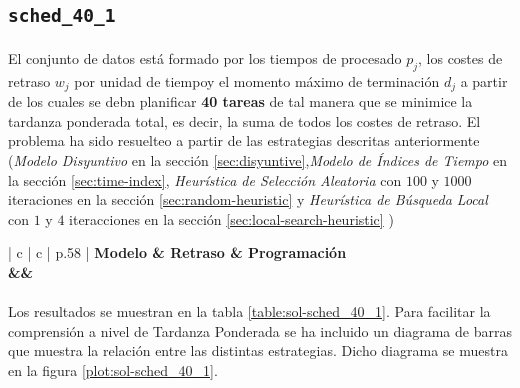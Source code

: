 \documentclass[spanish]{article}
\begin{document}
		\subsection{\texttt{sched\_40\_1}}

			\paragraph{}
			El conjunto de datos está formado por los tiempos de procesado $p_j$, los costes de retraso $w_j$ por unidad de tiempoy el momento máximo de terminación $d_j$ a partir de los cuales se debn planificar \textbf{40 tareas} de tal manera que se minimice la tardanza ponderada total, es decir, la suma de todos los costes de retraso. El problema ha sido resuelteo a partir de las estrategias descritas anteriormente (\emph{Modelo Disyuntivo} en la sección \ref{sec:disyuntive},\emph{Modelo de Índices de Tiempo} en la sección \ref{sec:time-index}, \emph{Heurística de Selección Aleatoria} con $100$ y $1000$ iteraciones en la sección \ref{sec:random-heuristic} y \emph{Heurística de Búsqueda Local} con $1$ y $4$ iteracciones en la sección \ref{sec:local-search-heuristic} )

			\begin{table}[h]
				\centering
				\begin{tabu}{ | c | c | p{.58\linewidth} |}
					\hline
					\bfseries Modelo & \bfseries Retraso & \bfseries Programación
					{\\\hline\model&\delay&\schedule}
					\\\hline
				\end{tabu}
				\caption{Resultados Obtenidos para el problema \texttt{sched\_40\_1}}
				\label{table:sol-sched_40_1}
			\end{table}

			\paragraph{}
			Los resultados se muestran en la tabla \ref{table:sol-sched_40_1}. Para facilitar la comprensión a nivel de Tardanza Ponderada se ha incluido un diagrama de barras que muestra la relación entre las distintas estrategias. Dicho diagrama se muestra en la figura \ref{plot:sol-sched_40_1}.
\end{document}
